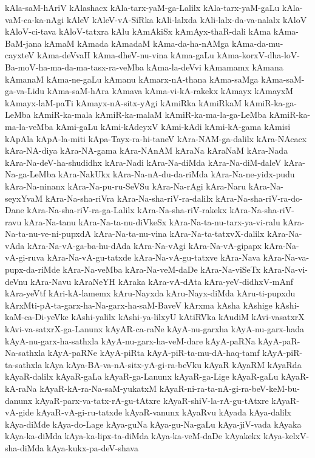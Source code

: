 {kAla-saM-hAriV
kAlashacx
kAla-tarx-yaM-ga-Lalilx
kAla-tarx-yaM-gaLu
kAla-vaM-ca-ka-nAgi
kAleV
kAleV-vA-SiRka
kAli-lalxda
kAli-lalx-da-va-nalalx
kAloV
kAloV-ci-tava
kAloV-tatxra
kAlu
kAmAkiSx
kAmAyx-thaR-dali
kAma
kAma-BaM-jana
kAmaM
kAmada
kAmadaM
kAma-da-ha-nAMga
kAma-da-mu-cayxteV
kAma-deVvaH
kAma-dheV-nu-vina
kAma-gaLu
kAma-korxV-dha-loV-Ba-moV-ha-ma-da-ma-tasx-ra-veMba
kAma-la-deVvi
kAmamamx
kAmana
kAmanaM
kAma-ne-gaLu
kAmanu
kAmarx-nA-thana
kAma-saMga
kAma-saM-ga-va-Lidu
kAma-saM-hAra
kAmava
kAma-vi-kA-rakekx
kAmayx
kAmayxM
kAmayx-laM-paTi
kAmayx-nA-sitx-yAgi
kAmiRka
kAmiRkaM
kAmiR-ka-ga-LeMba
kAmiR-ka-mala
kAmiR-ka-malaM
kAmiR-ka-ma-la-ga-LeMba
kAmiR-ka-ma-la-veMba
kAmi-gaLu
kAmi-kAdeyxV
kAmi-kAdi
kAmi-kA-gama
kAmisi
kApAla
kApA-la-miti
kApa-Tayx-ra-hi-taneV
kAra-NAM-ga-dalilx
kAra-NAcacx
kAra-NA-diya
kAra-NA-gama
kAra-NAnAM
kAraNa
kAraNaM
kAra-Nada
kAra-Na-deV-ha-shudidhx
kAra-Nadi
kAra-Na-diMda
kAra-Na-diM-daleV
kAra-Na-ga-LeMba
kAra-NakUkx
kAra-Na-nA-du-da-riMda
kAra-Na-ne-yidx-pudu
kAra-Na-ninanx
kAra-Na-pu-ru-SeVSu
kAra-Na-rAgi
kAra-Naru
kAra-Na-seyxYvaM
kAra-Na-sha-riVra
kAra-Na-sha-riV-ra-dalilx
kAra-Na-sha-riV-ra-do-Dane
kAra-Na-sha-riV-ra-ga-Lalilx
kAra-Na-sha-riV-rakekx
kAra-Na-sha-riV-ravu
kAra-Na-tanu
kAra-Na-ta-nu-diVkeSx
kAra-Na-ta-nu-tarx-ya-vi-ralu
kAra-Na-ta-nu-ve-ni-pupxdA
kAra-Na-ta-nu-vina
kAra-Na-ta-tatxvX-dalilx
kAra-Na-vAda
kAra-Na-vA-ga-ba-hu-dAda
kAra-Na-vAgi
kAra-Na-vA-gipapx
kAra-Na-vA-gi-ruva
kAra-Na-vA-gu-tatxde
kAra-Na-vA-gu-tatxve
kAra-Nava
kAra-Na-va-pupx-da-riMde
kAra-Na-veMba
kAra-Na-veM-daDe
kAra-Na-viSeTx
kAra-Na-vi-deVnu
kAra-Navu
kAraNeYH
kAraka
kAra-vA-dAta
kAra-yeV-didhxV-mAnf
kAra-yeVtf
kAri-kA-lamemx
kAru-Nayxda
kAru-Nayx-diMda
kAru-ti-pupxdu
kArxMti-pA-ta-garx-ha-Na-garx-ha-saM-BaveV
kArxma
kAsha
kAshige
kAshi-kaM-ca-Di-yeVke
kAshi-yalilx
kAshi-ya-lilxyU
kAtiRVka
kAudiM
kAvi-vasatxrX
kAvi-va-satxrX-ga-Lanunx
kAyAR-ca-raNe
kAyA-nu-garxha
kAyA-nu-garx-hada
kAyA-nu-garx-ha-sathxla
kAyA-nu-garx-ha-veM-dare
kAyA-paRNa
kAyA-paR-Na-sathxla
kAyA-paRNe
kAyA-piRta
kAyA-piR-ta-mu-dA-haq-tamf
kAyA-piR-ta-sathxla
kAya
kAya-BA-va-nA-sitx-yA-gi-ra-beVku
kAyaR
kAyaRM
kAyaRda
kAyaR-dalilx
kAyaR-gaLa
kAyaR-ga-Lanunx
kAyaR-ga-Lige
kAyaR-gaLu
kAyaR-kA-raNa
kAyaR-kA-ra-Na-saM-yukatxM
kAyaR-ni-ra-ta-nA-gi-ra-beV-keM-bu-danunx
kAyaR-parx-va-tatx-rA-gu-tAtxre
kAyaR-shiV-la-rA-gu-tAtxre
kAyaR-vA-gide
kAyaR-vA-gi-ru-tatxde
kAyaR-vanunx
kAyaRvu
kAyada
kAya-dalilx
kAya-diMde
kAya-do-Lage
kAya-guNa
kAya-gu-Na-gaLu
kAya-jiV-vada
kAyaka
kAya-ka-diMda
kAya-ka-lipx-ta-diMda
kAya-ka-veM-daDe
kAyakekx
kAya-kelxV-sha-diMda
kAya-kukx-pa-deV-shava
}
